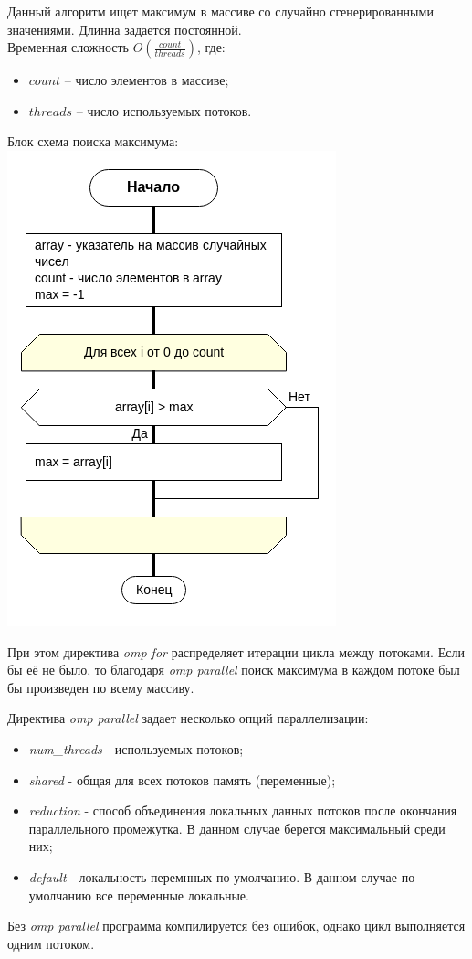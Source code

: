 \documentclass[a4paper, 12pt]{article}
\begin{document}
Данный алгоритм ищет максимум в массиве со случайно сгенерированными значениями. Длинна задается постоянной.\\
Временная сложность $O(\frac{count}{threads})$, где:
\begin{itemize}
 \item $count$ -- число элементов в массиве;
 \item $threads$ -- число используемых потоков.
\end{itemize}

\vspace{0.5cm}

Блок схема поиска максимума:\\
\includegraphics[scale=0.6]{res/flowchart.png}

\vspace{0.5cm}

При этом директива \textit{omp for} распределяет итерации цикла между потоками.
Если бы её не было, то благодаря \textit{omp parallel} поиск максимума в каждом потоке был бы произведен по всему массиву.

Директива \textit{omp parallel} задает несколько опций параллелизации:
\begin{itemize}
 \item \textit{num\_threads} - используемых потоков;
 \item \textit{shared} - общая для всех потоков память (переменные);
 \item \textit{reduction} - способ объединения локальных данных потоков после окончания параллельного промежутка. В данном случае берется максимальный среди них;
 \item \textit{default} - локальность перемнных по умолчанию. В данном случае по умолчанию все переменные локальные.
\end{itemize}
Без \textit{omp parallel} программа компилируется без ошибок, однако цикл выполняется одним потоком.
\end{document}
